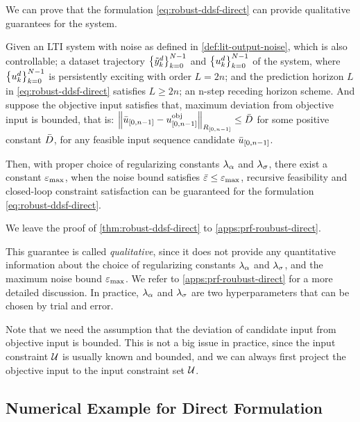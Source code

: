 We can prove that the formulation \cref{eq:robust-ddsf-direct} can provide qualitative guarantees for the system.

\begin{theorem}\label{thm:robust-ddsf-direct}
    Given an LTI system with noise as defined in \cref{def:lit-output-noise}, which is also controllable; a dataset trajectory $\left\{\tilde{y}^d_k\right\}_{k=0}^{N-1}$ and $\left\{u^d_k\right\}_{k=0}^{N-1}$ of the system, where $\left\{u^d_k\right\}_{k=0}^{N-1}$ is persistently exciting with order $L=2n$; and the prediction horizon $L$ in \cref{eq:robust-ddsf-direct} satisfies $L \geq 2n$; an n-step receding horizon scheme.
    And suppose the objective input satisfies that, maximum deviation from objective input is bounded, that is: $\norm{\bar{u}_{\left[ 0, n-1 \right]} - u^{\text{obj}}_{\left[ 0, n-1 \right]}}_{R_{\left[ 0, n-1 \right]}} \leq \bar{D}$ for some positive constant $\bar{D}$, for any feasible input sequence candidate $\bar{u}_{\left[ 0, n-1 \right]}$.

    Then, with proper choice of regularizing constants $\lambda_\alpha$ and $\lambda_\sigma$, there exist a constant $\varepsilon_{\text{max}}$, when the noise bound satisfies $\bar{\varepsilon} \leq \varepsilon_{\text{max}}$, recursive feasibility and closed-loop constraint satisfaction can be guaranteed for the formulation \cref{eq:robust-ddsf-direct}.
\end{theorem}

We leave the proof of \cref{thm:robust-ddsf-direct} to \cref{apps:prf-roubust-direct}.

This guarantee is called \emph{qualitative}, since it does not provide any quantitative information about the choice of regularizing constants $\lambda_\alpha$ and $\lambda_\sigma$, and the maximum noise bound $\varepsilon_{\text{max}}$.
We refer to \cref{apps:prf-roubust-direct} for a more detailed discussion.
In practice, $\lambda_\alpha$ and $\lambda_\sigma$ are two hyperparameters that can be chosen by trial and error.

Note that we need the assumption that the deviation of candidate input from objective input is bounded.
This is not a big issue in practice, since the input constraint $\mathcal{U}$ is usually known and bounded, and we can always first project the objective input to the input constraint set $\mathcal{U}$.

\subsection{Numerical Example for Direct Formulation}\label{subsec:numerical-example-direct}

